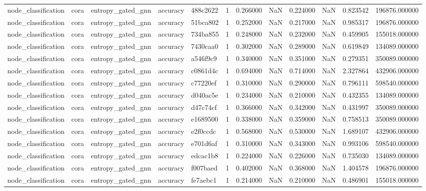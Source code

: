 \begin{tabular}{lllllrrrrrrr}
node_classification & cora & entropy_gated_gnn & accuracy & 488c2622 & 1 & 0.266000 & NaN & 0.224000 & NaN & 0.823542 & 196876.000000 \\
node_classification & cora & entropy_gated_gnn & accuracy & 51bca802 & 1 & 0.252000 & NaN & 0.217000 & NaN & 0.985317 & 196876.000000 \\
node_classification & cora & entropy_gated_gnn & accuracy & 734ba855 & 1 & 0.248000 & NaN & 0.232000 & NaN & 0.459905 & 155018.000000 \\
node_classification & cora & entropy_gated_gnn & accuracy & 7430caa0 & 1 & 0.302000 & NaN & 0.289000 & NaN & 0.619849 & 134089.000000 \\
node_classification & cora & entropy_gated_gnn & accuracy & a546f9c9 & 1 & 0.340000 & NaN & 0.351000 & NaN & 0.279351 & 350089.000000 \\
node_classification & cora & entropy_gated_gnn & accuracy & c0861d4c & 1 & 0.694000 & NaN & 0.714000 & NaN & 2.327864 & 432906.000000 \\
node_classification & cora & entropy_gated_gnn & accuracy & c77220ef & 1 & 0.310000 & NaN & 0.290000 & NaN & 0.796111 & 598540.000000 \\
node_classification & cora & entropy_gated_gnn & accuracy & d040ac5e & 1 & 0.234000 & NaN & 0.210000 & NaN & 0.432355 & 134089.000000 \\
node_classification & cora & entropy_gated_gnn & accuracy & d47c74cf & 1 & 0.366000 & NaN & 0.342000 & NaN & 0.431997 & 350089.000000 \\
node_classification & cora & entropy_gated_gnn & accuracy & e1689500 & 1 & 0.338000 & NaN & 0.359000 & NaN & 0.758513 & 350089.000000 \\
node_classification & cora & entropy_gated_gnn & accuracy & e2f0ccdc & 1 & 0.568000 & NaN & 0.530000 & NaN & 1.689107 & 432906.000000 \\
node_classification & cora & entropy_gated_gnn & accuracy & e701d6af & 1 & 0.310000 & NaN & 0.343000 & NaN & 0.993106 & 598540.000000 \\
node_classification & cora & entropy_gated_gnn & accuracy & edcac1b8 & 1 & 0.224000 & NaN & 0.226000 & NaN & 0.735030 & 134089.000000 \\
node_classification & cora & entropy_gated_gnn & accuracy & f007baed & 1 & 0.402000 & NaN & 0.368000 & NaN & 1.404578 & 196876.000000 \\
node_classification & cora & entropy_gated_gnn & accuracy & fe7aebc1 & 1 & 0.214000 & NaN & 0.210000 & NaN & 0.486901 & 155018.000000 \\

\end{tabular}

